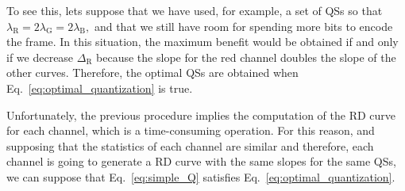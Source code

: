 To see this, lets suppose that we have used, for example, a set of QSs
so that
$\lambda_{\text{R}} = 2\lambda_{\text{G}} = 2\lambda_{\text{B}},$ and
that we still have room for spending more bits to encode the frame. In
this situation, the maximum benefit would be obtained if and only if
we decrease $\Delta_{\text{R}}$ because the slope for the red channel
doubles the slope of the other curves. Therefore, the optimal QSs are
obtained when Eq.~\ref{eq:optimal_quantization} is true.

\begin{comment}
Thus, the optimal QSs should
operate in the curves with the same RD slope,
\begin{equation}
  \lambda_{\text{R}} = \lambda_{\text{G}} = \lambda_{\text{B}},
  \label{eq:optimal_quantization}
\end{equation}
for a given total bit-rate $R$, which implies that the contribution of each channel (the ratio between
quality and bit-rate) to the quality of $\tilde{x}$ has been highest
possible~\cite{vetterli1995wavelets,sayood2017introduction}.
\end{comment}

Unfortunately, the previous procedure implies the computation of the
RD curve for each channel, which is a time-consuming operation. For
this reason, and supposing that the statistics of each channel are
similar and therefore, each channel is going to generate a RD curve
with the same slopes for the same QSs, we can suppose that
Eq.~\ref{eq:simple_Q} satisfies Eq.~\ref{eq:optimal_quantization}.

